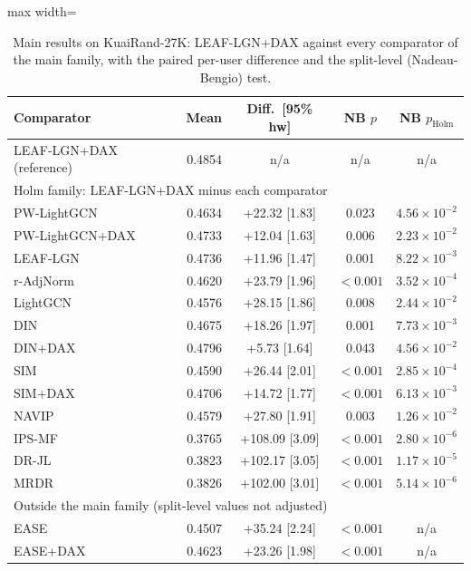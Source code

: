 \begin{table}[tbp]
\centering
\footnotesize
\caption{Main results on KuaiRand-27K: LEAF-LGN+DAX against every comparator of the main family, with the paired per-user difference and the split-level (Nadeau-Bengio) test.}
\label{tab:main}
\begin{adjustbox}{max width=\linewidth}
\begin{tabular}{lrccc}
\toprule
Comparator & Mean & Diff.\ [95\% hw] & NB $p$ & NB $p_{\mathrm{Holm}}$ \\
\midrule
LEAF-LGN+DAX (reference) & 0.4854 & n/a & n/a & n/a \\
\midrule
\multicolumn{5}{l}{Holm family: LEAF-LGN+DAX minus each comparator} \\
PW-LightGCN & 0.4634 & +22.32 [1.83] & 0.023 & $4.56\times10^{-2}$ \\
PW-LightGCN+DAX & 0.4733 & +12.04 [1.63] & 0.006 & $2.23\times10^{-2}$ \\
LEAF-LGN & 0.4736 & +11.96 [1.47] & 0.001 & $8.22\times10^{-3}$ \\
r-AdjNorm & 0.4620 & +23.79 [1.96] & $<0.001$ & $3.52\times10^{-4}$ \\
LightGCN & 0.4576 & +28.15 [1.86] & 0.008 & $2.44\times10^{-2}$ \\
DIN & 0.4675 & +18.26 [1.97] & 0.001 & $7.73\times10^{-3}$ \\
DIN+DAX & 0.4796 & +5.73 [1.64] & 0.043 & $4.56\times10^{-2}$ \\
SIM & 0.4590 & +26.44 [2.01] & $<0.001$ & $2.85\times10^{-4}$ \\
SIM+DAX & 0.4706 & +14.72 [1.77] & $<0.001$ & $6.13\times10^{-3}$ \\
NAVIP & 0.4579 & +27.80 [1.91] & 0.003 & $1.26\times10^{-2}$ \\
IPS-MF & 0.3765 & +108.09 [3.09] & $<0.001$ & $2.80\times10^{-6}$ \\
DR-JL & 0.3823 & +102.17 [3.05] & $<0.001$ & $1.17\times10^{-5}$ \\
MRDR & 0.3826 & +102.00 [3.01] & $<0.001$ & $5.14\times10^{-6}$ \\
\midrule
\multicolumn{5}{l}{Outside the main family (split-level values not adjusted)} \\
EASE & 0.4507 & +35.24 [2.24] & $<0.001$ & n/a \\
EASE+DAX & 0.4623 & +23.26 [1.98] & $<0.001$ & n/a \\
\bottomrule
\end{tabular}
\end{adjustbox}

\end{table}
